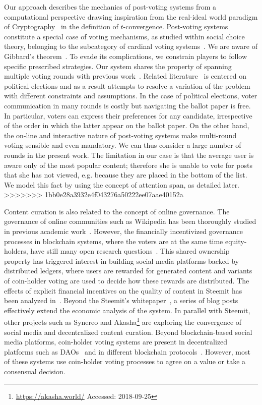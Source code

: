Our approach describes the mechanics of post-voting systems from a computational perspective drawing inspiration from the real-ideal world paradigm of Cryptography~\cite{goldreich1999foundations,lindell} in the definition of $t$-convergence.
Post-voting systems constitute a special case of voting mechanisms, as studied within social choice theory, belonging to the subcategory of cardinal voting systems~\cite{hillinger2005case}. We are aware of Gibbard's theorem~\cite{gibbard1973manipulation}. To evade its complications, we constrain players to follow specific prescribed strategies. Our system shares the property of spanning multiple voting rounds with previous work~\cite{kalech2011practical}. Related literature~\cite{lu2011robust,conitzer2005communication,xia2010compilation} is centered on political elections and as a result attempts to resolve a variation of the problem with different constraints and assumptions. In the case of political elections, voter communication in many rounds is costly but navigating the ballot paper is free. In particular, voters can express their preferences for any candidate, irrespective of the order in which the latter appear on the ballot paper. On the other hand, the on-line and interactive nature of post-voting systems make multi-round voting sensible and even mandatory. We can thus consider a large number of rounds in the present work. The limitation in our case is that the average user is aware only of the most popular content; therefore she is unable to vote for posts that she has not viewed, e.g. because they are placed in the bottom of the list. We model this fact by using the concept of attention span, as detailed later.
>>>>>>> 1bb0e28a3932e4f043276a50222ee07aae40152a

Content curation is also related to the concept of online governance. The governance of online communities such as Wikipedia has been thoroughly studied in previous academic work~\cite{leskovec2010governance,forte2008scaling}. However, the financially incentivized governance processes in blockchain systems, where the voters are at the same time equity-holders, have still many open research questions~\cite{vitalik,ehrsam}. This shared ownership property has triggered interest in building social media platforms backed by distributed ledgers, where users are rewarded for generated content and variants of coin-holder voting are used to decide how these rewards are distributed.
The effects of explicit financial incentives on the quality of content in Steemit has been analyzed in~\cite{thelwall2017can}.
Beyond the Steemit's whitepaper~\cite{steemit}, a series of blog posts~\cite{curationRewards,selfvoters} effectively extend the economic analysis of the system. In parallel with Steemit, other projects such as Synereo\cite{synereo} and Akasha\footnote{\url{https://akasha.world/} Accessed: 2018-09-25} are exploring the convergence of social media and decentralized content curation.
Beyond blockchain-based social media platforms, coin-holder voting systems are present in decentralized platforms such as DAOs~\cite{darkdaos} and in different blockchain protocols~\cite{dash,tezos}. However, most of these systems use coin-holder voting processes to agree on a value or take a consensual decision.
